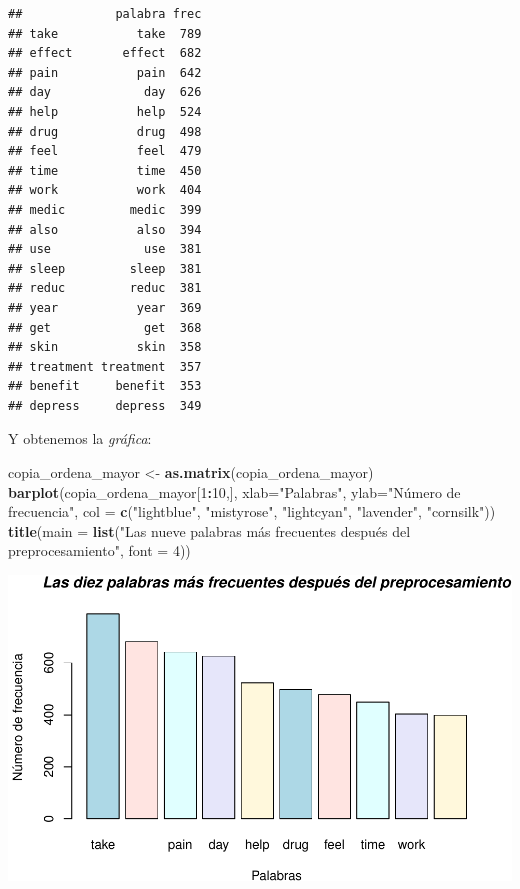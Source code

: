 \documentclass[spanish,]{article}
\newenvironment{Shaded}{\begin{snugshade}}{\end{snugshade}}
\newcommand{\KeywordTok}[1]{\textcolor[rgb]{0.13,0.29,0.53}{\textbf{#1}}}
\newcommand{\DataTypeTok}[1]{\textcolor[rgb]{0.13,0.29,0.53}{#1}}
\newcommand{\DecValTok}[1]{\textcolor[rgb]{0.00,0.00,0.81}{#1}}
\newcommand{\StringTok}[1]{\textcolor[rgb]{0.31,0.60,0.02}{#1}}
\newcommand{\OperatorTok}[1]{\textcolor[rgb]{0.81,0.36,0.00}{\textbf{#1}}}
\newcommand{\NormalTok}[1]{#1}
\begin{document}
\begin{verbatim}
##             palabra frec
## take           take  789
## effect       effect  682
## pain           pain  642
## day             day  626
## help           help  524
## drug           drug  498
## feel           feel  479
## time           time  450
## work           work  404
## medic         medic  399
## also           also  394
## use             use  381
## sleep         sleep  381
## reduc         reduc  381
## year           year  369
## get             get  368
## skin           skin  358
## treatment treatment  357
## benefit     benefit  353
## depress     depress  349
\end{verbatim}

Y obtenemos la \emph{gráfica}:

\begin{Shaded}
\begin{Highlighting}[]
\NormalTok{copia_ordena_mayor <-}\StringTok{ }\KeywordTok{as.matrix}\NormalTok{(copia_ordena_mayor)}
\KeywordTok{barplot}\NormalTok{(copia_ordena_mayor[}\DecValTok{1}\OperatorTok{:}\DecValTok{10}\NormalTok{,],  }\DataTypeTok{xlab=}\StringTok{"Palabras"}\NormalTok{, }\DataTypeTok{ylab=}\StringTok{"Número de frecuencia"}\NormalTok{,}
        \DataTypeTok{col =} \KeywordTok{c}\NormalTok{(}\StringTok{"lightblue"}\NormalTok{, }\StringTok{"mistyrose"}\NormalTok{, }\StringTok{"lightcyan"}\NormalTok{,}
                \StringTok{"lavender"}\NormalTok{, }\StringTok{"cornsilk"}\NormalTok{))}
\KeywordTok{title}\NormalTok{(}\DataTypeTok{main =} \KeywordTok{list}\NormalTok{(}\StringTok{"Las nueve palabras más frecuentes después del preprocesamiento"}\NormalTok{, }\DataTypeTok{font =} \DecValTok{4}\NormalTok{))}
\end{Highlighting}
\end{Shaded}

\includegraphics{practica-original_files/figure-latex/unnamed-chunk-74-1.pdf}
\end{document}
